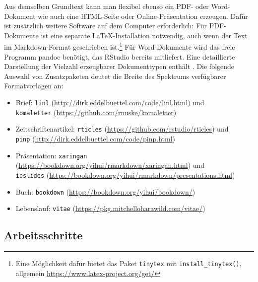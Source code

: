 Aus demselben Grundtext kann man flexibel ebenso ein PDF- oder Word-Dokument wie auch eine HTML-Seite oder Online-Präsentation erzeugen. Dafür ist zusätzlich weitere Software auf dem Computer erforderlich: Für PDF-Dokumente ist eine separate \LaTeX-Installation notwendig, auch wenn der Text im Markdown-Format geschrieben ist.\footnote{Eine Möglichkeit dafür bietet das Paket \lstinline!tinytex! \cite{Xie2019a, Xie2019b} mit \lstinline!install_tinytex()!,\\ allgemein \url{https://www.latex-project.org/get/}} Für Word-Dokumente wird das freie Programm pandoc \cite{McFarlane2016} benötigt, das RStudio bereits mitliefert. Eine detaillierte Darstellung der Vielzahl erzeugbarer Dokumenttypen enthält . Die folgende Auswahl von Zusatzpaketen deutet die Breite des Spektrums verfügbarer Formatvorlagen an:
\begin{itemize}
\item Brief: \lstinline!linl! (\url{http://dirk.eddelbuettel.com/code/linl.html}) und\\ \lstinline!komaletter! (\url{https://github.com/rnuske/komaletter})
\item Zeitschriftenartikel: \lstinline!rticles! (\url{https://github.com/rstudio/rticles}) und\\ \lstinline!pinp! (\url{http://dirk.eddelbuettel.com/code/pinp.html})
\item Präsentation: \lstinline!xaringan! (\url{https://bookdown.org/yihui/rmarkdown/xaringan.html}) und\\ \lstinline!ioslides! (\url{https://bookdown.org/yihui/rmarkdown/presentations.html})
\item Buch: \lstinline!bookdown! (\url{https://bookdown.org/yihui/bookdown/})
\item Lebenslauf: \lstinline!vitae! (\url{https://pkg.mitchelloharawild.com/vitae/})
\end{itemize}

\subsection{Arbeitsschritte}

